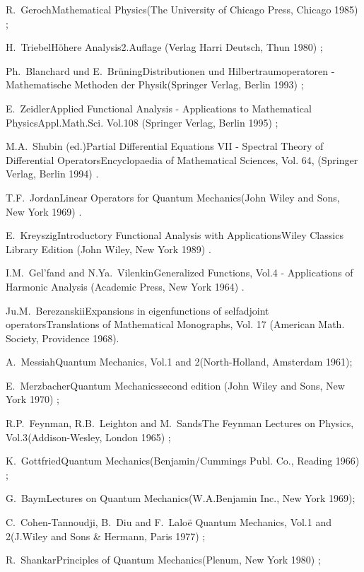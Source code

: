 \documentclass[a4wide,12pt]{report}
\begin{document}
\begin{thebibliography}{22}
\bookref
{R.~Geroch}{Mathematical Physics}{(The University of Chicago Press,
Chicago 1985) ;}
 
\bookref
{H.~Triebel}{H\"ohere Analysis}{2.Auflage (Verlag Harri Deutsch, Thun
1980) ;}

\bookref
{Ph.~Blanchard und E.~Br\"uning}{Distributionen und 
Hilbertraumoperatoren - Mathematische Methoden der 
Physik}{(Springer Verlag, Berlin 1993) ;} 

\bookref
{E.~Zeidler}{Applied Functional Analysis - Applications to Mathematical
Physics}{Appl.Math.Sci. Vol.108 (Springer Verlag, Berlin 1995) ;}

\bookref
{M.A.~Shubin (ed.)}{Partial Differential Equations VII - 
Spectral Theory of Differential Operators}{Encyclopaedia
of Mathematical Sciences, Vol. 64, (Springer Verlag, Berlin 1994) .} 

 
\bookref
{T.F.~Jordan}{Linear Operators for Quantum Mechanics}{(John
Wiley and Sons, New York 1969) .}


\bookref
{E.~Kreyszig}{Introductory Functional Analysis with Applications}{Wiley
Classics Library Edition (John Wiley, New York 1989) .}

 
\bookref
{I.M.~Gel'fand and N.Ya.~Vilenkin}{Generalized Functions, Vol.4 -
Applications of Harmonic Analysis}{
(Academic Press, New York 1964) .}
 
 
\bookref
{Ju.M.~Berezanskii}{Expansions in eigenfunctions 
of selfadjoint operators}{Translations of Mathematical 
Monographs, Vol. 17 (American Math. Society, Providence 1968).} 

 
\bookref
{A.~Messiah}{Quantum Mechanics, Vol.1 and 2}{(North-Holland, Amsterdam 1961);}
 
\bookref
{E.~Merzbacher}{Quantum Mechanics}{second edition (John
Wiley and Sons, New York 1970) ;}
 
\bookref
{R.P.~Feynman, R.B.~Leighton and M.~Sands}{The Feynman Lectures
on Physics, Vol.3}{(Addison-Wesley, London 1965) ;}
 
\bookref
{K.~Gottfried}{Quantum Mechanics}{(Benjamin/Cummings Publ. Co.,
Reading 1966) ;}
 
\bookref
{G.~Baym}{Lectures on Quantum Mechanics}{(W.A.Benjamin Inc.,
New York 1969);}
 
\bookref
{C.~Cohen-Tannoudji, B.~Diu and F.~Lalo\"e}{
Quantum Mechanics, Vol.1 and 2}{(J.Wiley and Sons \&  
Hermann, Paris 1977) ;}
 
\bookref
{R.~Shankar}{Principles of Quantum Mechanics}{(Plenum, New York 1980) ;}
 

\end{thebibliography}
\end{document}
